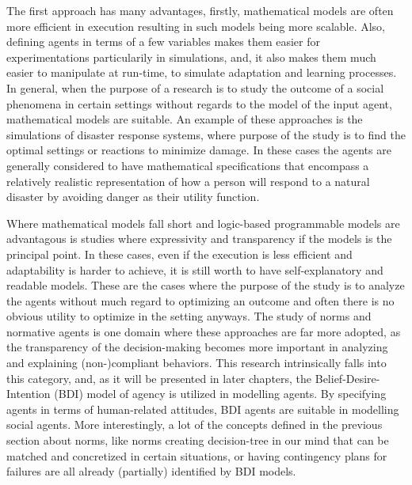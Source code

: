 The first approach has many advantages, firstly, mathematical models are often more efficient in execution resulting in such models being more scalable. Also, defining agents in terms of a few variables makes them easier for experimentations particularily in simulations, and, it also makes them much easier to manipulate at run-time, to simulate adaptation and learning processes. In general, when the purpose of a research is to study the outcome of a social phenomena in certain settings without regards to the model of the input agent, mathematical models are suitable. An example of these approaches is the simulations of disaster response systems, where purpose of the study is to find the optimal settings or reactions to minimize damage. In these cases the agents are generally considered to have mathematical specifications that encompass a relatively realistic representation of how a person will respond to a natural disaster by avoiding danger as their utility function\cite{Something}.


Where mathematical models fall short and logic-based programmable models are advantagous is studies where expressivity and transparency if the models is the principal point. In these cases, even if the execution is less efficient and adaptability is harder to achieve, it is still worth to have self-explanatory and readable models. These are the cases where the purpose of the study is to analyze the agents without much regard to optimizing an outcome and often there is no obvious utility to optimize in the setting anyways. The study of norms and normative agents is one domain where these approaches are far more adopted, as the transparency of the decision-making becomes more important in analyzing and explaining (non-)compliant behaviors. This research intrinsically falls into this category, and, as it will be presented in later chapters, the Belief-Desire-Intention (BDI) model of agency \cite{Something} is utilized in modelling agents. By specifying agents in terms of human-related attitudes, BDI agents are suitable in modelling social agents. More interestingly, a lot of the concepts defined in the previous section about norms, like norms creating decision-tree in our mind that can be matched and concretized in certain situations, or having contingency plans for failures are all already (partially) identified by BDI models.


